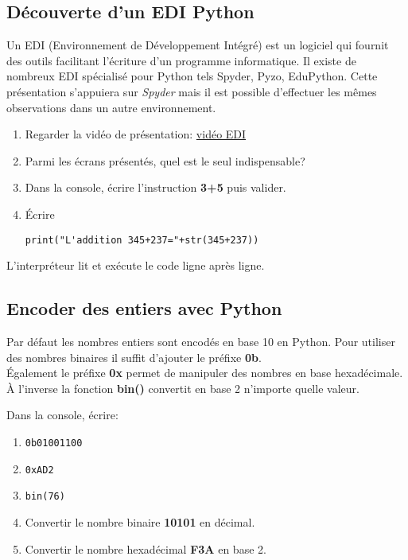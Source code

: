 \documentclass[a4paper,11pt]{article}
\begin{document}
\begin{Form}
\subsection{Découverte d'un EDI Python}
Un EDI (Environnement de Développement Intégré) est un logiciel qui fournit des outils facilitant l'écriture d'un programme informatique. Il existe de nombreux EDI spécialisé pour Python tels Spyder, Pyzo, EduPython. Cette présentation s'appuiera sur \emph{Spyder} mais il est possible d'effectuer les mêmes observations dans un autre environnement.
\begin{activite}
\begin{enumerate}
\item Regarder la vidéo de présentation: \href{ressources/edi.html}{vidéo EDI}
\item Parmi les écrans présentés, quel est le seul indispensable?
\item Dans la console, écrire l'instruction \textbf{3+5} puis valider.
\item Écrire \begin{lstlisting}
print("L'addition 345+237="+str(345+237))
\end{lstlisting}
\end{enumerate}
\end{activite}
L'interpréteur lit et exécute le code ligne après ligne.
\subsection{Encoder des entiers avec Python}
Par défaut les nombres entiers sont encodés en base 10 en Python. Pour utiliser des nombres binaires il suffit d'ajouter le préfixe \textbf{0b}.\\
Également le préfixe \textbf{0x} permet de manipuler des nombres en base hexadécimale.\\
À l'inverse la fonction \textbf{bin()} convertit en base 2 n'importe quelle valeur.
\begin{activite}
Dans la console, écrire:
\begin{enumerate}
\item \begin{lstlisting}
0b01001100
\end{lstlisting}
\item \begin{lstlisting}
0xAD2
\end{lstlisting}
\item \begin{lstlisting}
bin(76)
\end{lstlisting}
\item Convertir le nombre binaire \textbf{10101} en décimal.
\item Convertir le nombre hexadécimal \textbf{F3A} en base 2.
\end{enumerate}
\end{activite}

\end{Form}
\end{document}
